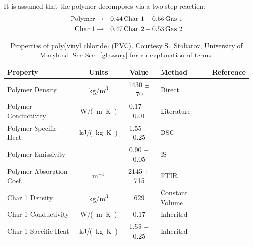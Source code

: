 It is assumed that the polymer decomposes via a two-step reaction:
\begin{eqnarray}
   \hbox{Polymer} &\to& 0.44 \, \hbox{Char 1} + 0.56 \, \hbox{Gas 1}  \\
   \hbox{Char 1}  &\to& 0.47 \, \hbox{Char 2} + 0.53 \, \hbox{Gas 2}
\end{eqnarray}


\begin{table}[h!]
\caption[Properties of poly(vinyl chloride) (PVC)]{Properties of poly(vinyl chloride) (PVC). Courtesy S.~Stoliarov, University of Maryland. See Sec.~\ref{glossary} for an explanation of terms.}
\begin{center}
\begin{tabular}{|l|c|c|l|l|}
\hline
Property                    & Units         & Value                             & Method                    &  Reference                                \\ \hline \hline
Polymer Density             & \unit{kg/m^3}      & 1430 $\pm$ 70                     & Direct                    &  \cite{Stoliarov:CF2010}                  \\ \hline
Polymer Conductivity        & \unit{W/(m.K)}& 0.17 $\pm$ 0.01                   & Literature                &  \cite{Stoliarov:CF2010}                  \\ \hline
Polymer Specific Heat       & \unit{kJ/(kg.K)}       & 1.55 $\pm$ 0.25                   & DSC                       &  \cite{Stoliarov:PDS2008}                 \\ \hline
Polymer Emissivity          &               & 0.90 $\pm$ 0.05                   & IS                        &  \cite{Hallman:PES1974}                   \\ \hline
Polymer Absorption Coef.    & m$^{-1}$      & 2145 $\pm$ 715                    & FTIR                      &  \cite{Tsilingiris:ECM2003}               \\ \hline
Char 1 Density              & \unit{kg/m^3}      & 629                               & Constant Volume           &  \cite{Stoliarov:CF2010}                  \\ \hline
Char 1 Conductivity         & \unit{W/(m.K)}& 0.17                              & Inherited                 &  \cite{Stoliarov:CF2010}                  \\ \hline
Char 1 Specific Heat        & \unit{kJ/(kg.K)}       & 1.55 $\pm$ 0.25                   & Inherited                 &  \cite{Stoliarov:CF2010}                  \\ \hline

\end{tabular}
\end{center}
\end{table}
